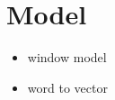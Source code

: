 \section{Model}
\label{sec:model}

\begin{itemize}
  \item window model
  \item word to vector
\end{itemize}
